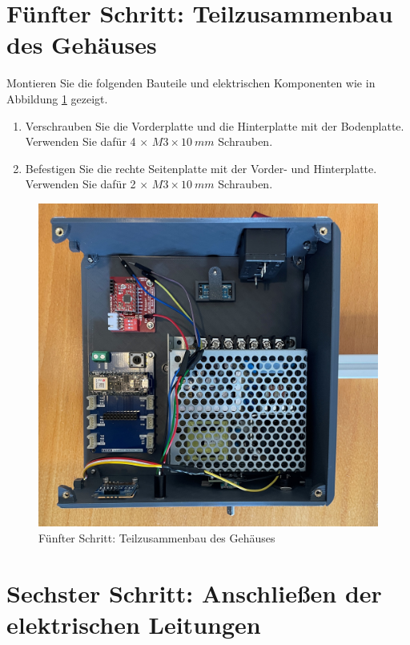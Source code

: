\section{Fünfter Schritt: Teilzusammenbau des Gehäuses}

Montieren Sie die folgenden Bauteile und elektrischen Komponenten wie in Abbildung \ref{5.S} gezeigt. 

\begin{enumerate}
	\item Verschrauben Sie die Vorderplatte und die Hinterplatte mit der Bodenplatte. Verwenden Sie dafür 4 $\times$ $ M3 \times 10 \ mm $ Schrauben.
	\item Befestigen Sie die rechte Seitenplatte mit der Vorder- und Hinterplatte. Verwenden Sie dafür 2 $\times$ $ M3 \times 10 \ mm $ Schrauben.
\end{enumerate}

\begin{figure}[H]
	\begin{center}
		\includegraphics[width=\textwidth]{Images/5Schr.jpg}
		\caption{Fünfter Schritt: Teilzusammenbau des Gehäuses} \label{5.S}
	\end{center}
\end{figure}


\section{Sechster Schritt: Anschließen der elektrischen Leitungen}


